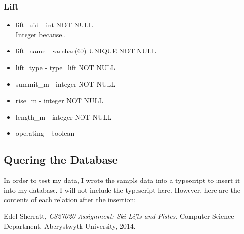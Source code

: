 \documentclass[11pt]{scrartcl} %
\begin{document}
\subsubsection{Lift}
\begin{itemize}
\item lift\_uid - int NOT NULL\\
Integer because..
\item lift\_name - varchar(60) UNIQUE NOT NULL
\item lift\_type - type\_lift NOT NULL
\item summit\_m - integer NOT NULL
\item rise\_m - integer NOT NULL
\item length\_m - integer NOT NULL
\item operating - boolean
\end{itemize}

\subsection{Quering the Database}
In order to test my data, I wrote the sample data into a typescript to insert it into my database. I will not include the typescript here. However, here are the contents of each relation after the insertion:
\newpage

\begin{thebibliography}{9}

  Edel Sherratt,
  \emph{CS27020 Assignment: Ski Lifts and Pistes}.
  Computer Science Department,
  Aberystwyth University,
  2014.

\end{thebibliography}
\end{document}
